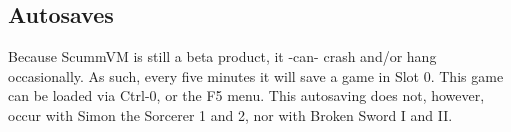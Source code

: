 \subsection {Autosaves}
Because ScummVM is still a beta product, it -can- crash and/or hang
occasionally. As such, every five minutes it will save a game in Slot 0. This
game can be loaded via Ctrl-0, or the F5 menu. This autosaving does not, 
however, occur with Simon the Sorcerer 1 and 2, nor with Broken Sword I and II.
